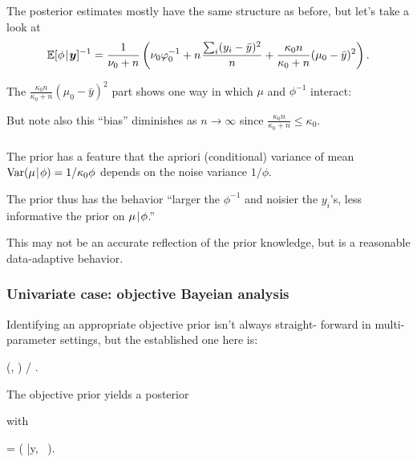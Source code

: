 \documentclass[18pt]{beamer}
\newcommand{\defineTightItemizeSpacing}{%
	\setlength{\abovedisplayskip}{.25\baselineskip}%
	\setlength{\belowdisplayskip}{.25\baselineskip}%
}
\newenvironment{tightEquation*}{%
	\defineTightItemizeSpacing%
	\begin{equation*}
}{
	\end{equation*} \ignorespacesafterend
}
\newcommand{\given}{\thinnerspace | \thinnerspace}
\newcommand{\thinnerspace}{\mskip.5\thinmuskip}
\newcommand{\expectation}{\mathbb{E}}
\newcommand{\variance}{\mathrm{Var}}
\newcommand{\normalDist}{\mathcal{N}}
\newcommand{\gammaDist}{\mathrm{Gamma}}
\newcommand{\density}{\pi}
\begin{document}
\begin{frame}
\frametitle{\frametitleText}
The posterior estimates mostly have the same structure as before, but let's take a look at
\begin{equation*}
\expectation[ \phi \given \bm{y} ]^{-1}
	= \frac{1}{\nu_0 + n} \left(
		\nu_0 \varphi_0^{-1} 
		+ n \thinnerspace \frac{ \textstyle \sum_i (y_i - \bar{y})^2 }{ n }
		+ \frac{\kappa_0 n}{\kappa_0 + n} (\mu_0 - \bar{y} )^2
	\right).
\end{equation*}

\pause
The $\frac{\kappa_0 n}{\kappa_0 + n} (\mu_0 - \bar{y} )^2$ part shows one way in which $\mu$ and $\phi^{-1}$ interact:
\begin{tightEquation*}
%
\end{tightEquation*}

\pause
\smallskip
But note also this ``bias'' diminishes as $n \to \infty$ since $\frac{\kappa_0 n}{\kappa_0 + n} \leq \kappa_0$.
\end{frame}


\begin{frame}
\frametitle{\frametitleText}
The prior has a feature that the apriori (conditional) variance of mean $\variance(\mu \given \phi) = 1 / \kappa_0 \phi$ depends on the noise variance $1 / \phi$.

\pause
\smallskip
The prior thus has the behavior ``larger the $\phi^{-1}$ and noisier the $y_i$'s, less informative the prior on $\mu \given \phi$.''

\pause
\smallskip
This may not be an accurate reflection of the prior knowledge, but is a reasonable data-adaptive behavior.
\end{frame}


\renewcommand{\frametitleText}{Univariate case: objective Bayeian analysis}
\begin{frame}
\frametitle{\frametitleText}
Identifying an appropriate objective prior isn't always straight- forward in multi-parameter settings, but the established one here is:
\begin{tightEquation*}
\density(\mu, \phi)  / \phi.
\end{tightEquation*}

\pause
The objective prior yields a posterior
with
\begin{tightEquation*}
\expectation\!\left[ 
	(\mu, \phi) \given \bm{y}
\right]
	= \left( 
		\bar{y}, \, 
	\right).
\end{tightEquation*}
\end{frame}
\end{document}

